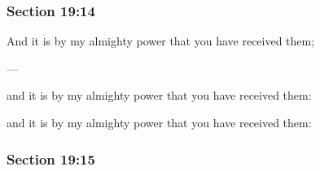 	\subsubsection{Section 19:14} %
		\label{DC19-14}

		And it is by my almighty power that you have received them;

		\begin{framed}
		\scriptsize
			\begin{compactdesc}
				\item[JSP] ---
				\item[RB1] [\textit{missing}]
				\item[DC 1835] and it is by my almighty power that you have received them: 
				\item[DC 1844] and it is by my almighty power that you have received them: 
			\end{compactdesc}
		\end{framed}

	\subsubsection{Section 19:15} %
		\label{DC19-15}

